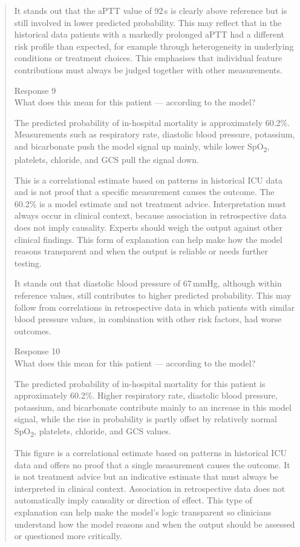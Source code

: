 \documentclass[12pt, a4paper]{article}
\begin{document}
\begin{quote}
It stands out that the aPTT value of 92\,s is clearly above reference but is still involved in lower predicted probability. This may reflect that in the historical data patients with a markedly prolonged aPTT had a different risk profile than expected, for example through heterogeneity in underlying conditions or treatment choices. This emphasises that individual feature contributions must always be judged together with other measurements.

Response 9\\
What does this mean for this patient --- according to the model?

The predicted probability of in-hospital mortality is approximately 60.2\%. Measurements such as respiratory rate, diastolic blood pressure, potassium, and bicarbonate push the model signal up mainly, while lower SpO\textsubscript{2}, platelets, chloride, and GCS pull the signal down.

This is a correlational estimate based on patterns in historical ICU data and is not proof that a specific measurement causes the outcome. The 60.2\% is a model estimate and not treatment advice. Interpretation must always occur in clinical context, because association in retrospective data does not imply causality. Experts should weigh the output against other clinical findings. This form of explanation can help make how the model reasons transparent and when the output is reliable or needs further testing.

It stands out that diastolic blood pressure of 67\,mmHg, although within reference values, still contributes to higher predicted probability. This may follow from correlations in retrospective data in which patients with similar blood pressure values, in combination with other risk factors, had worse outcomes.

Response 10\\
What does this mean for this patient --- according to the model?

The predicted probability of in-hospital mortality for this patient is approximately 60.2\%. Higher respiratory rate, diastolic blood pressure, potassium, and bicarbonate contribute mainly to an increase in this model signal, while the rise in probability is partly offset by relatively normal SpO\textsubscript{2}, platelets, chloride, and GCS values.

This figure is a correlational estimate based on patterns in historical ICU data and offers no proof that a single measurement causes the outcome. It is not treatment advice but an indicative estimate that must always be interpreted in clinical context. Association in retrospective data does not automatically imply causality or direction of effect. This type of explanation can help make the model's logic transparent so clinicians understand how the model reasons and when the output should be assessed or questioned more critically.


\end{quote}
\end{document}
